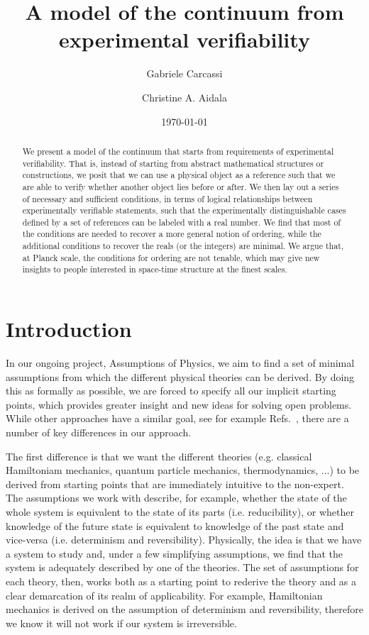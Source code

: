 \documentclass{article}
\title{A model of the continuum from experimental verifiability}
\author[1]{Gabriele Carcassi}
\author[1]{Christine A. Aidala}
\affil[1]{
	Physics Department\\
	University of Michigan
	}
\date{\today}
\begin{document}
\maketitle


\begin{abstract}
We present a model of the continuum that starts from requirements of experimental verifiability. That is, instead of starting from abstract mathematical structures or constructions, we posit that we can use a physical object as a reference such that we are able to verify whether another object lies before or after. We then lay out a series of necessary and sufficient conditions, in terms of logical relationships between experimentally verifiable statements, such that the experimentally distinguishable cases defined by a set of references can be labeled with a real number. We find that most of the conditions are needed to recover a more general notion of ordering, while the additional conditions to recover the reals (or the integers) are minimal. We argue that, at Planck scale, the conditions for ordering are not tenable, which may give new insights to people interested in space-time structure at the finest scales.
\end{abstract}

\section{Introduction}

In our ongoing project, Assumptions of Physics, we aim to find a set of minimal assumptions from which the different physical theories can be derived. By doing this as formally as possible, we are forced to specify all our implicit starting points, which provides greater insight and new ideas for solving open problems. While other approaches have a similar goal, see for example Refs.~\cite{PhysRevA.84.012311,QLogicReview,Hardy:2001jk,ludwig_hein_2013}, there are a number of key differences in our approach.

The first difference is that we want the different theories (e.g. classical Hamiltoniam mechanics, quantum particle mechanics, thermodynamics, ...) to be derived from starting points that are immediately intuitive to the non-expert. The assumptions we work with describe, for example, whether the state of the whole system is equivalent to the state of its parts (i.e. reducibility), or whether knowledge of the future state is equivalent to knowledge of the past state and vice-versa (i.e. determinism and reversibility). Physically, the idea is that we have a system to study and, under a few simplifying assumptions, we find that the system is adequately described by one of the theories. The set of assumptions for each theory, then, works both as a starting point to rederive the theory and as a clear demarcation of its realm of applicability. For example, Hamiltonian mechanics is derived on the assumption of determinism and reversibility, therefore we know it will not work if our system is irreversible.
\end{document}
